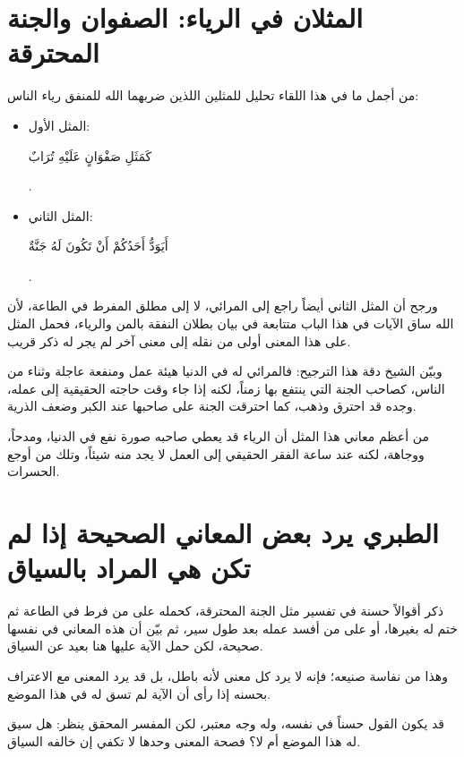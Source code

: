 \section{المثلان في الرياء: الصفوان والجنة المحترقة}
من أجمل ما في هذا اللقاء تحليل  للمثلين اللذين ضربهما الله للمنفق رياء الناس:
\begin{itemize}
    \item المثل الأول: \begin{ayah}كَمَثَلِ صَفْوَانٍ عَلَيْهِ تُرَابٌ\end{ayah}.
    \item المثل الثاني: \begin{ayah}أَيَوَدُّ أَحَدُكُمْ أَنْ تَكُونَ لَهُ جَنَّةٌ\end{ayah}.
\end{itemize}

ورجح  أن المثل الثاني أيضاً راجع إلى المرائي، لا إلى مطلق المفرط في الطاعة، لأن الله ساق الآيات في هذا الباب متتابعة في بيان بطلان النفقة بالمن والرياء، فحمل المثل على هذا المعنى أولى من نقله إلى معنى آخر لم يجر له ذكر قريب.

وبيّن الشيخ دقة هذا الترجيح: فالمرائي له في الدنيا هيئة عمل ومنفعة عاجلة وثناء من الناس، كصاحب الجنة التي ينتفع بها زمناً، لكنه إذا جاء وقت حاجته الحقيقية إلى عمله، وجده قد احترق وذهب، كما احترقت الجنة على صاحبها عند الكبر وضعف الذرية.

\begin{fawaid}
من أعظم معاني هذا المثل أن الرياء قد يعطي صاحبه صورة نفع في الدنيا، ومدحاً، ووجاهة، لكنه عند ساعة الفقر الحقيقي إلى العمل لا يجد منه شيئاً، وتلك من أوجع الحسرات.
\end{fawaid}

\section{الطبري يرد بعض المعاني الصحيحة إذا لم تكن هي المراد بالسياق}
ذكر  أقوالاً حسنة في تفسير مثل الجنة المحترقة، كحمله على من فرط في الطاعة ثم ختم له بغيرها، أو على من أفسد عمله بعد طول سير، ثم بيّن أن هذه المعاني في نفسها صحيحة، لكن حمل الآية عليها هنا بعيد عن السياق.

وهذا من نفاسة صنيعه؛ فإنه لا يرد كل معنى لأنه باطل، بل قد يرد المعنى مع الاعتراف بحسنه إذا رأى أن الآية لم تسق له في هذا الموضع.

\begin{fawaid}
قد يكون القول حسناً في نفسه، وله وجه معتبر، لكن المفسر المحقق ينظر: هل سيق له هذا الموضع أم لا؟ فصحة المعنى وحدها لا تكفي إن خالفه السياق.
\end{fawaid}

